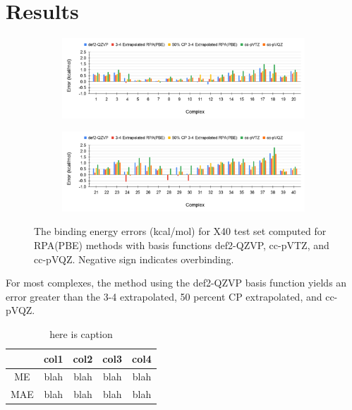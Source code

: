 \documentclass[11pt]{article}
\begin{document}
\section{Results}

\begin{figure}[H]
  \centering
  \begin{subfigure}{\textwidth}
    \center
    \includegraphics[scale=0.35]{def2-QZVP_1.png}
    \label{fig:def2-QZVP_1}
  \end{subfigure}
  \begin{subfigure}{\textwidth}
    \center
    \includegraphics[scale=0.35]{def2-QZVP_2.png}
    \label{fig:def2-QZVP_2}
  \end{subfigure}
  \caption{The binding energy errors (kcal/mol) for X40 test set computed
    for RPA(PBE) methods with basis functions def2-QZVP, cc-pVTZ, and
    cc-pVQZ. Negative sign indicates overbinding.}
  \label{fig:def2-QZVP Error}
\end{figure}

For most complexes, the method using the def2-QZVP basis function yields
an error greater than the 3-4 extrapolated, 50 percent CP
extrapolated, and cc-pVQZ. 

\begin{table}[hbpt]
  \caption{here is caption}
  \centering
  \begin{tabular}{c|cccc}
       & col1 & col2 & col3 & col4 \\
    \hline\hline
    ME & blah & blah & blah & blah \\
    MAE & blah & blah & blah & blah
  \end{tabular}
  \label{tab:stuff}
\end{table}
\end{document}
